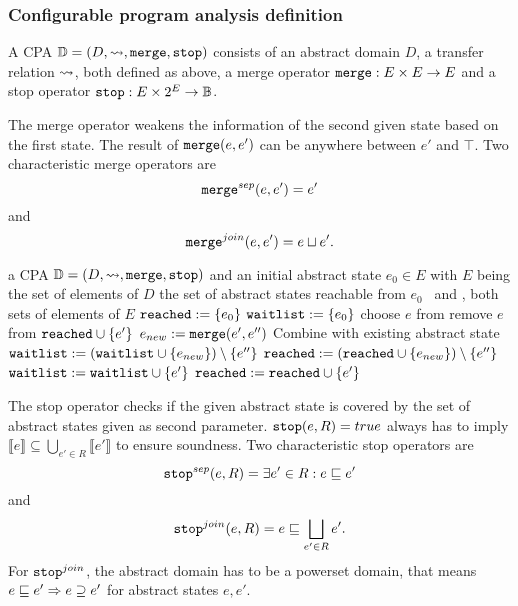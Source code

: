 \subsubsection{Configurable program analysis definition}
A CPA $\mathbb{D} = (D, \rightsquigarrow, \texttt{merge}, \texttt{stop})$ consists of an abstract domain $D$, a transfer relation $\rightsquigarrow$, both defined as above, a merge operator $\texttt{merge} : E \times E \rightarrow E$ and a stop operator $\texttt{stop} : E \times 2^E \rightarrow \mathbb{B}$.

The merge operator weakens the information of the second given state based on the first state. The result of $\texttt{merge}(e, e')$ can be anywhere between $e'$ and $\top$.
Two characteristic merge operators are \[\texttt{merge}^{sep}(e, e') = e'\] and \[\texttt{merge}^{join}(e, e') = e \sqcup e'.\]
\begin{algorithm}[t]
\caption{$CPA(\cpa, e_0)$}
\label{alg:CPA}
\begin{algorithmic}[1]

\Input a CPA $\mathbb{D} = (D, \rightsquigarrow, \texttt{merge}, \texttt{stop})$ 
	    and an initial abstract state $e_0 \in E$ with $E$ being the set of elements of $D$
\Output the set of abstract states reachable from $e_0$
\Variables \reachedSet\ and \waitlistSet , both sets of elements of $E$
\State $\texttt{reached} := \{e_0\}$
\State $\texttt{waitlist} := \{e_0\}$
\While{$\waitlistSet \neq \varnothing$}
	\State choose $e$ from \waitlistSet \State remove $e$ from \waitlistSet
		 \label{alg:cpa:isTarget}
			\Return $\texttt{reached} \cup \{ e' \}$
		\EndIf
		 \label{alg:cpa:mergeStart}
			\State $e_{new} := \texttt{merge}(e', e'')$ \Comment Combine with existing abstract state
				\State $\texttt{waitlist} := (\texttt{waitlist} \cup \{ e_{new} \}) \setminus \{ e'' \}$
				\State $\texttt{reached} := (\texttt{reached} \cup \{ e_{new} \}) \setminus \{ e'' \}$
			\EndIf
		\EndFor \label{alg:cpa:mergeStop}
		 \label{alg:cpa:stopCheck}
			\State $\texttt{waitlist} := \texttt{waitlist} \cup \{e'\}$
			\State $\texttt{reached} := \texttt{reached} \cup \{e'\}$
		\EndIf
	\EndFor
\EndWhile\\ 
\Return \reachedSet
\end{algorithmic}
\end{algorithm}

The stop operator checks if the given abstract state is covered by the set of abstract states given as second parameter.
$\texttt{stop}(e, R) = true$ always has to imply $\llbracket e \rrbracket \subseteq \bigcup_{e' \in R} \llbracket e' \rrbracket$ to ensure soundness.
Two characteristic stop operators are \[\texttt{stop}^{sep}(e, R) = \exists e' \in R : e \sqsubseteq e'\] and \[\texttt{stop}^{join}(e, R) = e \sqsubseteq \bigsqcup\limits_{e' \in R} e'.\]
For $\texttt{stop}^{join}$, the abstract domain has to be a powerset domain, that means $e \sqsubseteq e' \Rightarrow e \supseteq e'$ for abstract states $e, e'$.

